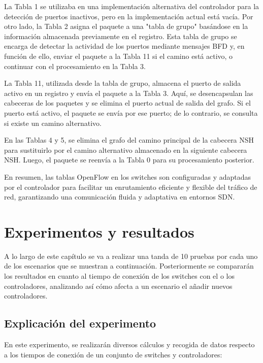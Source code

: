 \documentclass[a4paper, 12pt]{book}
\begin{document}
	La Tabla 1 se utilizaba en una implementación alternativa del controlador para la detección de puertos inactivos, pero en la implementación actual está vacía. Por otro lado, la Tabla 2 asigna el paquete a una "tabla de grupo" basándose en la información almacenada previamente en el registro. Esta tabla de grupo se encarga de detectar la actividad de los puertos mediante mensajes BFD y, en función de ello, enviar el paquete a la Tabla 11 si el camino está activo, o continuar con el procesamiento en la Tabla 3.
	
	La Tabla 11, utilizada desde la tabla de grupo, almacena el puerto de salida activo en un registro y envía el paquete a la Tabla 3. Aquí, se desencapsulan las cabeceras de los paquetes y se elimina el puerto actual de salida del grafo. Si el puerto está activo, el paquete se envía por ese puerto; de lo contrario, se consulta si existe un camino alternativo.
	
	En las Tablas 4 y 5, se elimina el grafo del camino principal de la cabecera NSH para sustituirlo por el camino alternativo almacenado en la siguiente cabecera NSH. Luego, el paquete se reenvía a la Tabla 0 para su procesamiento posterior.
	
	En resumen, las tablas OpenFlow en los switches son configuradas y adaptadas por el controlador para facilitar un enrutamiento eficiente y flexible del tráfico de red, garantizando una comunicación fluida y adaptativa en entornos SDN.
	
	
	\cleardoublepage
	\chapter{Experimentos y resultados}
	\label{chap:experimentos}
	
 	A lo largo de este capítulo se va a realizar una tanda de 10 pruebas por cada uno de los escenarios que se muestran a continuación. Posteriormente se compararán los resultados en cuanto al tiempo de conexión de los switches con el o los controladores, analizando así cómo afecta a un escenario el añadir nuevos controladores.%
	 
	\section{Explicación del experimento}
	En este experimento, se realizarán diversos cálculos y recogida de datos respecto a los tiempos de conexión de un conjunto de switches y controladores: 
	
\end{document}
